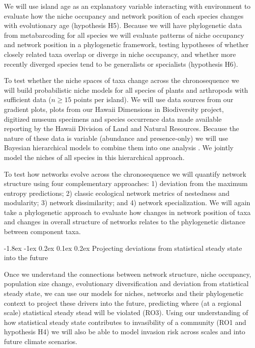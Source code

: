 \documentclass[11pt]{article}
\makeatletter
\renewcommand\subsubsection{\@startsection{subsection}{1}{\z@}%
                                  {-1.8ex \@plus -1ex \@minus 0.2ex}%
                                  {0.1ex \@plus 0.2ex}%
                                  {\normalfont\bfseries}}
\makeatother
\begin{document}
We will use island age as an explanatory variable interacting with
environment to evaluate how the niche occupancy and network position
of each species changes with evolutionary age (hypothesis H5).
Because we will have phylogenetic data from metabarcoding for all
species we will evaluate patterns of niche occupancy and network
position in a phylogenetic framework, testing hypotheses of whether
closely related taxa overlap or diverge in niche occupancy, and
whether more recently diverged species tend to be generalists or
specialists (hypothesis H6).

To test whether the niche spaces of taxa change across the
chronosequence we will build probabilistic niche models for all
species of plants and arthropods with sufficient data ($n \geq 15$
points per island).  We will use data sources from our gradient plots,
plots from our Hawaii Dimensions in Biodiversity project, digitized
museum specimens and species occurrence data made available reporting
by the Hawaii Division of Land and Natural Resources.  Because the
nature of these data is variable (abundance and presence-only) we will
use Bayesian hierarchical models to combine them into one analysis
\citep{hsdm}.  We jointly model the niches of all species in this
hierarchical approach.

To test how networks evolve across the chronosequence we will quantify
network structure using four complementary approaches: 1) deviation
from the maximum entropy predictions; 2) classic ecological network
metrics of nestedness and modularity; 3) network dissimilarity; and 4)
network specialization.  We will again take a phylogenetic approach to
evaluate how changes in network position of taxa and changes in
overall structure of networks relates to the phylogenetic distance
between component taxa.


\subsubsection{Projecting deviations from statistical steady state
  into the future}

Once we understand the connections between network structure, niche
occupancy, population size change, evolutionary diversification and
deviation from statistical steady state, we can use our models for
niches, networks and their phylogenetic context to project these
drivers into the future, predicting where (at a regional scale)
statistical steady stead will be violated (RO3).  Using our
understanding of how statistical steady state contributes to
invasibility of a community (RO1 and hypothesis H4) we will also be
able to model invasion risk across scales and into future climate
scenarios.
\end{document}
